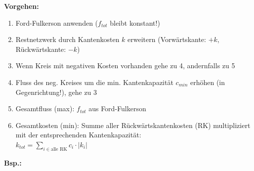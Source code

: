 \textbf{Vorgehen:}
\begin{enumerate}
	\item Ford-Fulkerson anwenden ($f_{tot}$ bleibt konstant!)
	\item Restnetzwerk durch Kantenkosten $k$ erweitern (Vorwärtskante: $+k$, Rückwärtskante: $-k$)
	\item Wenn Kreis mit negativen Kosten vorhanden gehe zu 4, andernfalls zu 5
	\item Fluss des neg. Kreises um die min. Kantenkapazität $c_{min}$ erhöhen (in Gegenrichtung!), gehe zu 3
	\item Gesamtfluss (max): $f_{tot}$ aus Ford-Fulkerson
	\item Gesamtkosten (min): Summe aller Rückwärtskantenkosten (RK) multipliziert mit der entsprechenden Kantenkapazität:\\  
	$k_{tot} = \sum\limits_{ i \in \text{alle RK}} c_i \cdot |k_i| $
\end{enumerate}

\textbf{Bsp.:}

